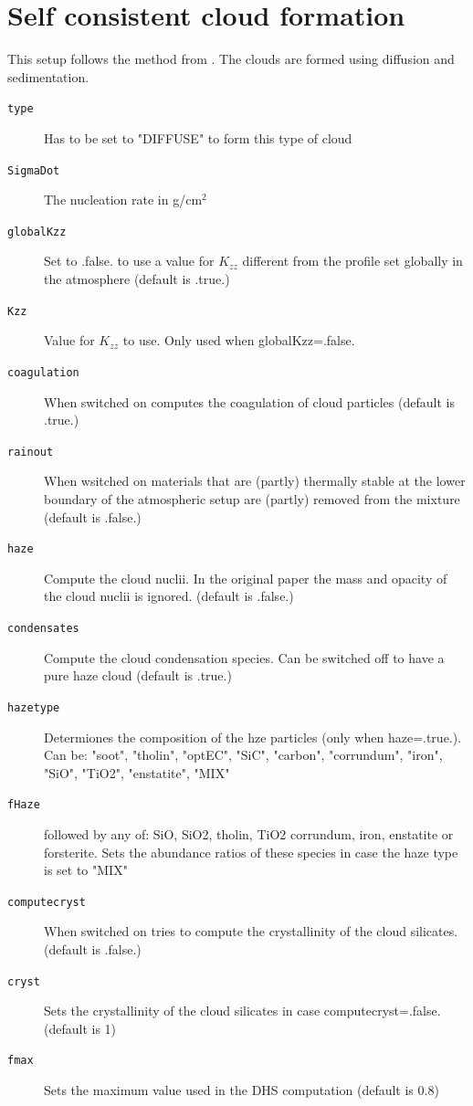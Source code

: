 \documentclass[12pt]{article}
\begin{document}
\section{Self consistent cloud formation}

This setup follows the method from \cite{2019A&A...622A.121O}. The clouds are formed using diffusion and sedimentation.

\begin{description}
\item[\texttt{type}]
Has to be set to "DIFFUSE" to form this type of cloud
\item[\texttt{SigmaDot}]
The nucleation rate in g/cm$^2$
\item[\texttt{globalKzz}]
Set to .false. to use a value for $K_{zz}$ different from the profile set globally in the atmosphere (default is .true.)
\item[\texttt{Kzz}]
Value for $K_{zz}$ to use. Only used when globalKzz=.false.
\item[\texttt{coagulation}] 
When switched on computes the coagulation of cloud particles (default is .true.)
\item[\texttt{rainout}] 
When wsitched on materials that are (partly) thermally stable at the lower boundary of the atmospheric setup are (partly) removed from the mixture (default is .false.)
\item[\texttt{haze}]
Compute the cloud nuclii. In the original paper the mass and opacity of the cloud nuclii is ignored. (default is .false.)
\item[\texttt{condensates}]
Compute the cloud condensation species. Can be switched off to have a pure haze cloud (default is .true.)
\item[\texttt{hazetype}]
Determiones the composition of the hze particles (only when haze=.true.). Can be: "soot", "tholin", "optEC", "SiC", "carbon", "corrundum", "iron", "SiO", "TiO2", "enstatite", "MIX"
\item[\texttt{fHaze}] followed by any of: SiO, SiO2, tholin, TiO2 corrundum, iron, enstatite or forsterite. Sets the abundance ratios of these species in case the haze type is set to "MIX"
\item[\texttt{computecryst}] 
When switched on tries to compute the crystallinity of the cloud silicates. (default is .false.)
\item[\texttt{cryst}]
Sets the crystallinity of the cloud silicates in case computecryst=.false. (default is 1)
\item[\texttt{fmax}]
Sets the maximum value used in the DHS computation (default is 0.8)
\end{description}
\end{document}
